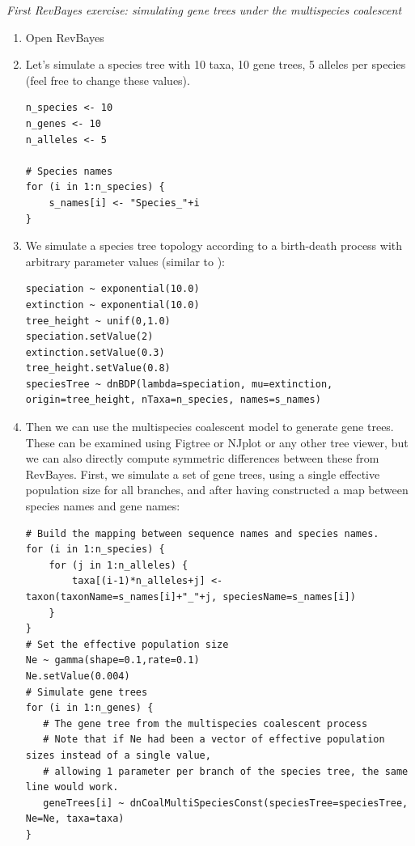 \documentclass[11pt]{article}
\begin{document}
{\begin{framed}

\begin{center}
\emph{First RevBayes exercise: simulating gene trees under the multispecies coalescent}
\end{center}
\begin{enumerate}
\item Open RevBayes
\item Let's simulate a species tree with 10 taxa, 10 gene trees, 5 alleles per species (feel free to change these values).
{\tt \begin{snugshade*}
\begin{lstlisting}
n_species <- 10
n_genes <- 10
n_alleles <- 5

# Species names
for (i in 1:n_species) {
	s_names[i] <- "Species_"+i
}
\end{lstlisting}
\end{snugshade*}}
\item We simulate a species tree topology according to a birth-death process with arbitrary parameter values (similar to \citet{Leache2011}):
{\tt \begin{snugshade*}
\begin{lstlisting}
speciation ~ exponential(10.0)
extinction ~ exponential(10.0)
tree_height ~ unif(0,1.0)
speciation.setValue(2)
extinction.setValue(0.3)
tree_height.setValue(0.8)
speciesTree ~ dnBDP(lambda=speciation, mu=extinction, origin=tree_height, nTaxa=n_species, names=s_names)
\end{lstlisting}
\end{snugshade*}}
\item Then we can use the multispecies coalescent model to generate gene trees. These can be examined using Figtree or NJplot or any other tree viewer, but we can also directly compute symmetric differences between these from RevBayes. First, we simulate a set of gene trees, using a single effective population size for all branches, and after having constructed a map between species names and gene names:
{\tt \begin{snugshade*}
\begin{lstlisting}
# Build the mapping between sequence names and species names.
for (i in 1:n_species) {
	for (j in 1:n_alleles) {
		taxa[(i-1)*n_alleles+j] <- taxon(taxonName=s_names[i]+"_"+j, speciesName=s_names[i])
	}
}
# Set the effective population size
Ne ~ gamma(shape=0.1,rate=0.1)
Ne.setValue(0.004)
# Simulate gene trees
for (i in 1:n_genes) {
   # The gene tree from the multispecies coalescent process
   # Note that if Ne had been a vector of effective population sizes instead of a single value, 
   # allowing 1 parameter per branch of the species tree, the same line would work.
   geneTrees[i] ~ dnCoalMultiSpeciesConst(speciesTree=speciesTree, Ne=Ne, taxa=taxa)
}
\end{lstlisting}
\end{snugshade*}}


\end{enumerate}
\end{framed}}
\end{document}
